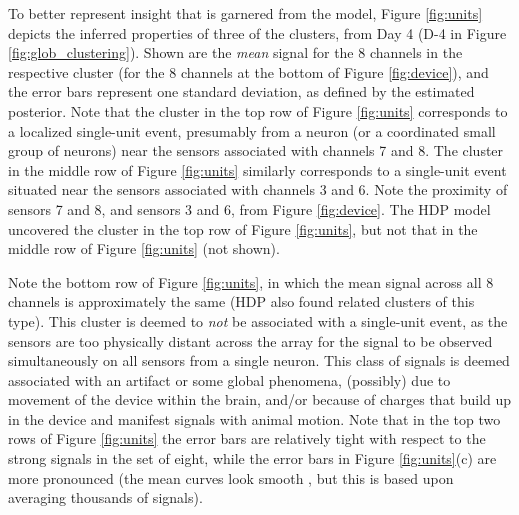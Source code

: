 \documentclass[journal]{IEEEtran}
\begin{document}
To better represent insight that is garnered from the model,  Figure \ref{fig:units} {depicts } the inferred properties of three of the clusters, from Day 4 (D-4 in Figure \ref{fig:glob_clustering}). Shown are the \emph{mean} signal for the 8 channels in the respective cluster (for the 8 channels at the bottom of Figure \ref{fig:device}), and the error bars represent one standard deviation, as defined by the estimated posterior. Note that the cluster in {the top row of } Figure \ref{fig:units} corresponds to a localized single-unit event, presumably from a neuron (or a coordinated small group of neurons) near the sensors associated with channels 7 and 8. The cluster in {the middle row of } Figure \ref{fig:units} similarly corresponds to a single-unit event situated near the sensors associated with channels 3 and 6. Note the proximity of sensors 7 and 8, and sensors 3 and 6, from Figure \ref{fig:device}. The HDP model uncovered the cluster in {the top row of } Figure \ref{fig:units}, but not that in {the middle row of } Figure \ref{fig:units} {(not shown)}.

Note {the bottom row of} Figure \ref{fig:units}, in which the mean signal across all 8 channels is approximately the same (HDP also found related clusters of this type). This cluster is deemed to \emph{not} be associated with a single-unit event, as the sensors are too physically distant across the array for the signal to be observed simultaneously on all sensors from a single neuron. This class of signals is deemed associated with an artifact or some global phenomena, (possibly) due to movement of the device within the brain, and/or because of charges that build up in the device and manifest signals with animal motion. Note that in {the top two rows of} Figure \ref{fig:units} the error bars are relatively tight with respect to the strong signals in the set of eight, while the error bars in Figure \ref{fig:units}(c) are more pronounced (the mean curves look {smooth}
, but this is based upon averaging thousands of signals).
\end{document}
